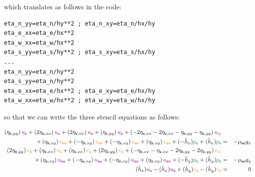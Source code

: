 which translates as follows in the code:

\begin{lstlisting}
eta_n_yy=eta_n/hy**2 ; eta_n_xy=eta_n/hx/hy
eta_e_xx=eta_e/hx**2
eta_w_xx=eta_w/hx**2
eta_s_yy=eta_s/hy**2 ; eta_s_xy=eta_s/hx/hy
...
eta_n_yy=eta_n/hy**2
eta_s_yy=eta_n/hy**2
eta_e_xx=eta_e/hx**2 ; eta_e_xy=eta_e/hx/hy
eta_w_xx=eta_w/hx**2 ; eta_w_xy=eta_w/hx/hy
\end{lstlisting}



so that we can write the three stencil equations as follows:

\begin{eqnarray}
\left( \eta_{{\tt n},yy} \right) {\color{violet} u_{\tt n}} + 
\left( 2\eta_{{\tt e},xx} \right) {\color{violet} u_{\tt e}} + 
\left( 2\eta_{{\tt w},xx} \right) {\color{violet} u_{\tt w}} + 
\left( \eta_{{\tt s},yy} \right) {\color{violet} u_{\tt s}} + 
\left( -2\eta_{{\tt e},xx} - 2\eta_{{\tt w},xx}
-\eta_{{\tt n},yy} -\eta_{{\tt s},yy}
\right) {\color{violet} u_\otimes} \nonumber\\
+
\left( \eta_{{\tt n},xy} \right) {\color{orange} v_{\tt ne}}+ 
\left(-\eta_{{\tt n},xy} \right) {\color{orange} v_{\tt nw}}+ 
\left(-\eta_{{\tt s},xy} \right) {\color{orange} v_{\tt se}}+ 
\left( \eta_{{\tt s},xy} \right) {\color{orange} v_{\tt sw}} 
+(- \tilde{h}_x) {\color{teal}p_{\tt e}} + (\tilde{h}_x ){\color{teal}p_{\tt w}} 
&=& -\rho_{\tt ns} g_x 
\nonumber\\
\left( 2\eta_{{\tt n},yy} \right) {\color{orange} v_{\tt n}} +
\left(  \eta_{{\tt e},xx} \right) {\color{orange} v_{\tt e}} +
\left(  \eta_{{\tt w},xx} \right) {\color{orange} v_{\tt w}} +
\left( 2\eta_{{\tt s},yy} \right) {\color{orange} v_{\tt s}} +
\left( 
-\eta_{{\tt e},xx}
-\eta_{{\tt w},xx}
-2\eta_{{\tt n},yy}
-2\eta_{{\tt s},yy}
\right) {\color{orange} v_\otimes} \nonumber\\
+
\left( \eta_{{\tt e},xy} \right) {\color{violet} u_{\tt ne}} +
\left(-\eta_{{\tt e},xy} \right) {\color{violet} u_{\tt se}} +
\left(-\eta_{{\tt w},xy} \right) {\color{violet} u_{\tt nw}} +
\left( \eta_{{\tt w},xy} \right) {\color{violet} u_{\tt sw}} 
+(-\tilde{h}_y ){\color{teal}p_{\tt n}} + (\tilde{h}_y) {\color{teal}p_{\tt s}}
&=& -\rho_{\tt ew} g_y \nonumber\\
(\tilde{h}_x) {\color{violet}u_{\tt e}}- 
(\tilde{h}_x) {\color{violet}u_{\tt w}}
+
(\tilde{h}_y) {\color{orange}v_{\tt n}}- 
(\tilde{h}_y){\color{orange}v_{\tt s}} &=&0 \nonumber
\end{eqnarray}











